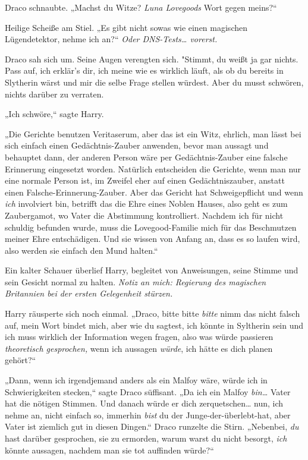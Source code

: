 {Draco schnaubte. „Machst du Witze? \emph{Luna Lovegoods} Wort gegen meins?“

Heilige Scheiße am Stiel. „Es gibt nicht sowas wie einen magischen Lügendetektor, nehme ich an?“ \emph{Oder DNS-Tests… vorerst.}

Draco sah sich um. Seine Augen verengten sich. "Stimmt, du weißt ja gar nichts. Pass auf, ich erklär's dir, ich meine wie es wirklich läuft, als ob du bereits in Slytherin wärst und mir die selbe Frage stellen würdest. Aber du musst schwören, nichts darüber zu verraten.

„Ich schwöre,“ sagte Harry.

„Die Gerichte benutzen Veritaserum, aber das ist ein Witz, ehrlich, man lässt bei sich einfach einen Gedächtnis-Zauber anwenden, bevor man aussagt und behauptet dann, der anderen Person wäre per Gedächtnis-Zauber eine falsche Erinnerung eingesetzt worden. Natürlich entscheiden die Gerichte, wenn man nur eine normale Person ist, im Zweifel eher auf einen Gedächtniszauber, anstatt einen Falsche-Erinnerung-Zauber. Aber das Gericht hat Schweigepflicht und wenn \emph{ich} involviert bin, betrifft das die Ehre eines Noblen Hauses, also geht es zum Zaubergamot, wo Vater die Abstimmung kontrolliert. Nachdem ich für nicht schuldig befunden wurde, muss die Lovegood-Familie mich für das Beschmutzen meiner Ehre entschädigen. Und sie wissen von Anfang an, dass es so laufen wird, also werden sie einfach den Mund halten.“

Ein kalter Schauer überlief Harry, begleitet von Anweisungen, seine Stimme und sein Gesicht normal zu halten. \emph{Notiz an mich: Regierung des magischen Britannien bei der ersten Gelegenheit stürzen.}

Harry räusperte sich noch einmal. „Draco, bitte bitte \emph{bitte} nimm das nicht falsch auf, mein Wort bindet mich, aber wie du sagtest, ich könnte in Syltherin sein und ich muss wirklich der Information wegen fragen, also was würde passieren \emph{theoretisch gesprochen,} wenn ich aussagen \emph{würde}, ich hätte es dich planen gehört?“

„Dann, wenn ich irgendjemand anders als ein Malfoy wäre, würde ich in Schwierigkeiten stecken,“ sagte Draco süffisant. „Da ich ein Malfoy \emph{bin…} Vater hat die nötigen Stimmen. Und danach würde er dich zerquetschen… nun, ich nehme an, nicht einfach so, immerhin \emph{bist} du der Junge-der-überlebt-hat, aber Vater ist ziemlich gut in diesen Dingen.“ Draco runzelte die Stirn. „Nebenbei, \emph{du} hast darüber gesprochen, sie zu ermorden, warum warst du nicht besorgt, \emph{ich} könnte aussagen, nachdem man sie tot auffinden würde?“

}

